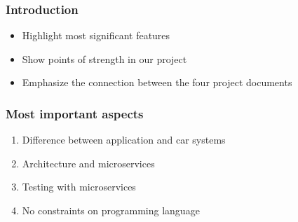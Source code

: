 \begin{frame}[t,plain]
    \titlepage
\end{frame}

\begin{frame}
    \frametitle{Introduction}
    \begin{itemize}
        \item Highlight most significant features
        \item Show points of strength in our project
        \item Emphasize the connection between the four project documents
    \end{itemize}
\end{frame}

\begin{frame}
	\frametitle{Most important aspects}
	\begin{enumerate}
		\item Difference between application and car systems
		\item Architecture and microservices
		\item Testing with microservices
		\item No constraints on programming language
	\end{enumerate}
\end{frame}
